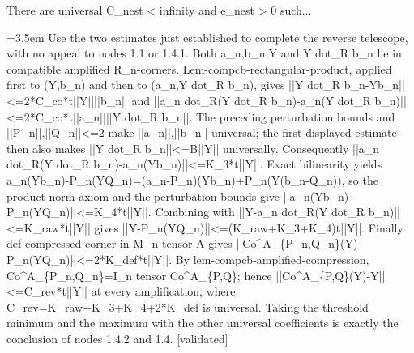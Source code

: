 \documentclass{article}
\newcommand{\step}[1]{\par\noindent\hangindent=3.5em\hangafter=1%
  \makebox[3.5em][l]{\textbf{#1.}}}
\newcommand{\steptag}[1]{\hfill{\small\textsf{[#1]}}}
\begin{document}
\begin{proofbox}{There are universal C\_nest < infinity and e\_nest > 0 such...}
\step{1.4.2.2} Use the two estimates just established to complete the reverse telescope, with no appeal to nodes 1.1 or 1.4.1. Both a\_n,b\_n,Y and Y dot\_R b\_n lie in compatible amplified R\_n-corners. Lem-compcb-rectangular-product, applied first to (Y,b\_n) and then to (a\_n,Y dot\_R b\_n), gives ||Y dot\_R b\_n-Yb\_n||<=2*C\_co*t||Y||||b\_n|| and ||a\_n dot\_R(Y dot\_R b\_n)-a\_n(Y dot\_R b\_n)||<=2*C\_co*t||a\_n||||Y dot\_R b\_n||. The preceding perturbation bounds and ||P\_n||,||Q\_n||<=2 make ||a\_n||,||b\_n|| universal; the first displayed estimate then also makes ||Y dot\_R b\_n||<=B||Y|| universally. Consequently ||a\_n dot\_R(Y dot\_R b\_n)-a\_n(Yb\_n)||<=K\_3*t||Y||. Exact bilinearity yields a\_n(Yb\_n)-P\_n(YQ\_n)=(a\_n-P\_n)(Yb\_n)+P\_n(Y(b\_n-Q\_n)), so the product-norm axiom and the perturbation bounds give ||a\_n(Yb\_n)-P\_n(YQ\_n)||<=K\_4*t||Y||. Combining with ||Y-a\_n dot\_R(Y dot\_R b\_n)||<=K\_raw*t||Y|| gives ||Y-P\_n(YQ\_n)||<=(K\_raw+K\_3+K\_4)t||Y||. Finally def-compressed-corner in M\_n tensor A gives ||Co\textasciicircum{}A\_\{P\_n,Q\_n\}(Y)-P\_n(YQ\_n)||<=2*K\_def*t||Y||. By lem-compcb-amplified-compression, Co\textasciicircum{}A\_\{P\_n,Q\_n\}=I\_n tensor Co\textasciicircum{}A\_\{P,Q\}; hence ||Co\textasciicircum{}A\_\{P,Q\}(Y)-Y||<=C\_rev*t||Y|| at every amplification, where C\_rev=K\_raw+K\_3+K\_4+2*K\_def is universal. Taking the threshold minimum and the maximum with the other universal coefficients is exactly the conclusion of nodes 1.4.2 and 1.4. \steptag{validated} \\[4pt]
\end{proofbox}
\end{document}
